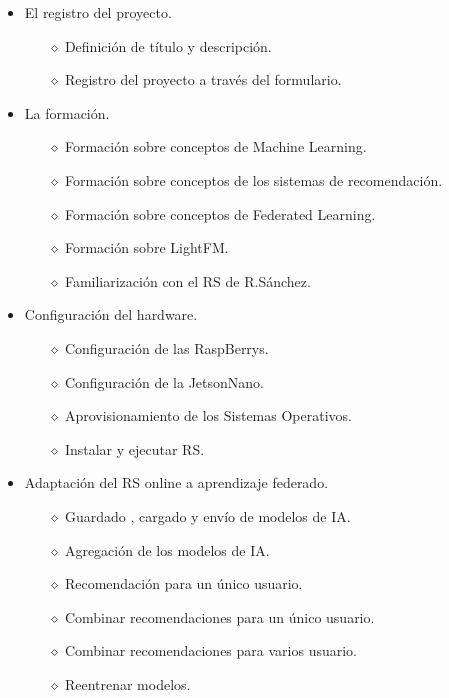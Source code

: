 \begin{itemize}
    \item El registro del proyecto. 
        \begin{itemize}
            \item [$\diamond$]Definición de título y descripción.
            \item [$\diamond$]Registro del proyecto a través del formulario.
        \end{itemize}
    \item La formación.
        \begin{itemize}
            \item [$\diamond$]Formación sobre conceptos de Machine Learning.
            \item [$\diamond$]Formación sobre conceptos de los sistemas de recomendación.
            \item [$\diamond$]Formación sobre conceptos de Federated Learning.
            \item [$\diamond$]Formación sobre LightFM.
            \item [$\diamond$]Familiarización con el RS de R.Sánchez.
        \end{itemize}
    \item Configuración del hardware.
        \begin{itemize}
            \item [$\diamond$]Configuración de las RaspBerrys.
            \item [$\diamond$]Configuración de la JetsonNano.
            \item [$\diamond$]Aprovisionamiento de los Sistemas Operativos.
            \item [$\diamond$]Instalar y ejecutar RS.
        \end{itemize}
    \item Adaptación del RS online a aprendizaje federado.
        \begin{itemize}
            \item [$\diamond$]Guardado , cargado y envío de modelos de IA.
            \item [$\diamond$]Agregación de los modelos de IA.
            \item [$\diamond$]Recomendación para un único usuario.
            \item [$\diamond$]Combinar recomendaciones para un único usuario.
            \item [$\diamond$]Combinar recomendaciones para varios usuario.
            \item [$\diamond$]Reentrenar modelos.

\end{itemize}
\end{itemize}
